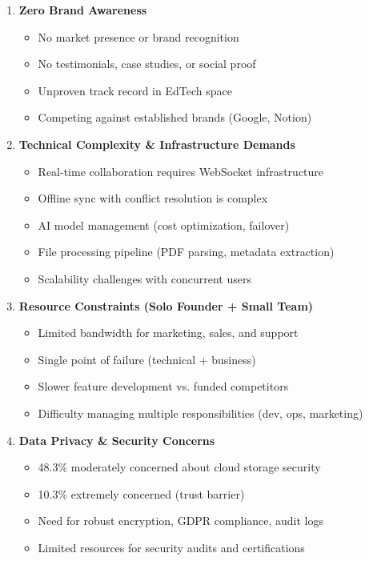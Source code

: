\begin{enumerate}
    \item \textbf{Zero Brand Awareness}
          \begin{itemize}
              \item No market presence or brand recognition
              \item No testimonials, case studies, or social proof
              \item Unproven track record in EdTech space
              \item Competing against established brands (Google, Notion)
          \end{itemize}

    \item \textbf{Technical Complexity \& Infrastructure Demands}
          \begin{itemize}
              \item Real-time collaboration requires WebSocket infrastructure
              \item Offline sync with conflict resolution is complex
              \item AI model management (cost optimization, failover)
              \item File processing pipeline (PDF parsing, metadata extraction)
              \item Scalability challenges with concurrent users
          \end{itemize}

    \item \textbf{Resource Constraints (Solo Founder + Small Team)}
          \begin{itemize}
              \item Limited bandwidth for marketing, sales, and support
              \item Single point of failure (technical + business)
              \item Slower feature development vs. funded competitors
              \item Difficulty managing multiple responsibilities (dev, ops, marketing)
          \end{itemize}

    \item \textbf{Data Privacy \& Security Concerns}
          \begin{itemize}
              \item 48.3\% moderately concerned about cloud storage security
              \item 10.3\% extremely concerned (trust barrier)
              \item Need for robust encryption, GDPR compliance, audit logs
              \item Limited resources for security audits and certifications
          \end{itemize}


\end{enumerate}
